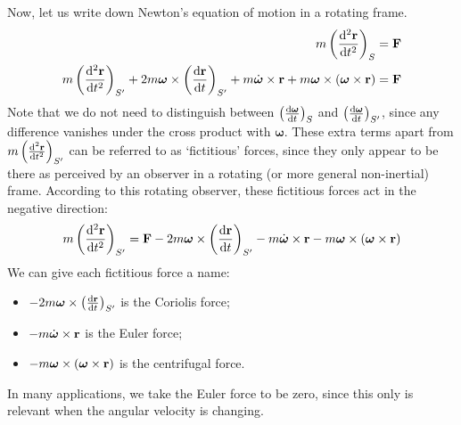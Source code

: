 Now, let us write down Newton's equation of motion in a rotating frame.
\begin{align*}
	m\left( \dv[2]{\vb r}{t} \right)_S                                                                                                                                          & = \vb F \\
	m\left( \dv[2]{\vb r}{t} \right)_{S'} + 2 m\bm\omega \times \left( \dv{\vb r}{t} \right)_{S'} + m\dot{\bm\omega} \times \vb r + m\bm\omega \times (\bm \omega \times \vb r) & = \vb F \\
\end{align*}
Note that we do not need to distinguish between \(\left( \dv{\bm\omega}{t} \right)_S\) and \(\left( \dv{\bm\omega}{t} \right)_{S'}\), since any difference vanishes under the cross product with \(\bm\omega\).
These extra terms apart from \(m\left( \dv[2]{\vb r}{t} \right)_{S'}\) can be referred to as `fictitious' forces, since they only appear to be there as perceived by an observer in a rotating (or more general non-inertial) frame.
According to this rotating observer, these fictitious forces act in the negative direction:
\[
	m\left( \dv[2]{\vb r}{t} \right)_{S'} = \vb F - 2 m\bm\omega \times \left( \dv{\vb r}{t} \right)_{S'} - m\dot{\bm\omega} \times \vb r - m\bm\omega \times (\bm \omega \times \vb r)
\]
We can give each fictitious force a name:
\begin{itemize}
	\item \(-2 m\bm\omega \times \left( \dv{\vb r}{t} \right)_{S'}\) is the Coriolis force;
	\item \(-m\dot{\bm\omega} \times \vb r\) is the Euler force;
	\item \(-m\bm\omega \times (\bm \omega \times \vb r)\) is the centrifugal force.
\end{itemize}
In many applications, we take the Euler force to be zero, since this only is relevant when the angular velocity is changing.

